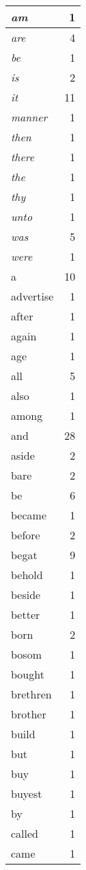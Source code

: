 \begin{center}
\begin{longtable}{l|r}
\emph{am} & 1 \\ \hline
\emph{are} & 4 \\ \hline
\emph{be} & 1 \\ \hline
\emph{is} & 2 \\ \hline
\emph{it} & 11 \\ \hline
\emph{manner} & 1 \\ \hline
\emph{then} & 1 \\ \hline
\emph{there} & 1 \\ \hline
\emph{the} & 1 \\ \hline
\emph{thy} & 1 \\ \hline
\emph{unto} & 1 \\ \hline
\emph{was} & 5 \\ \hline
\emph{were} & 1 \\ \hline
a & 10 \\ \hline
advertise & 1 \\ \hline
after & 1 \\ \hline
again & 1 \\ \hline
age & 1 \\ \hline
all & 5 \\ \hline
also & 1 \\ \hline
among & 1 \\ \hline
and & 28 \\ \hline
aside & 2 \\ \hline
bare & 2 \\ \hline
be & 6 \\ \hline
became & 1 \\ \hline
before & 2 \\ \hline
begat & 9 \\ \hline
behold & 1 \\ \hline
beside & 1 \\ \hline
better & 1 \\ \hline
born & 2 \\ \hline
bosom & 1 \\ \hline
bought & 1 \\ \hline
brethren & 1 \\ \hline
brother & 1 \\ \hline
build & 1 \\ \hline
but & 1 \\ \hline
buy & 1 \\ \hline
buyest & 1 \\ \hline
by & 1 \\ \hline
called & 1 \\ \hline
came & 1 \\ \hline

\end{longtable}
\end{center}
